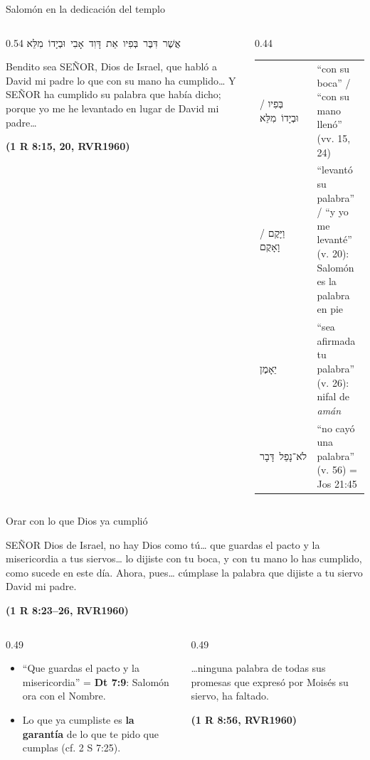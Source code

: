 \documentclass[hyperref={bookmarks=false},aspectratio=169]{beamer}
\newcommand{\heb}[1]{\mbox{\foreignlanguage{hebrew}{#1}}}
\newcommand{\SENOR}{S{\fontsize{0.78em}{1em}\selectfont EÑOR}}
\newcommand{\fuente}[1]{\par\hfill{\upshape\bfseries\footnotesize\textcolor{azul}{#1}}}
\newcommand{\destacar}[1]{\textbf{\textcolor{azul}{#1}}}
\begin{document}
\begin{frame}{Salomón en la dedicación del templo}
\begin{columns}[t,onlytextwidth]
\begin{column}{0.54\textwidth}
\centering\heb{אֲשֶׁר דִּבֶּר בְּפִיו אֵת דָּוִד אָבִי וּבְיָדוֹ מִלֵּא}
\begin{cita}Bendito sea \SENOR, Dios de Israel, que habló a David mi padre lo que con su mano ha cumplido\ldots{} Y \SENOR{} ha cumplido su palabra que había dicho; porque yo me he levantado en lugar de David mi padre\ldots\fuente{(1 R 8:15, 20, RVR1960)}\end{cita}
\end{column}
\begin{column}{0.44\textwidth}\scriptsize\renewcommand{\arraystretch}{1.12}
\begin{tabular}{@{}>{\RaggedRight\arraybackslash}p{1.7cm}>{\RaggedRight\arraybackslash}p{3.6cm}@{}}
\toprule
\heb{בְּפִיו} / \heb{וּבְיָדוֹ מִלֵּא} & ``con su boca'' / ``con su mano llenó'' (vv. 15, 24) \\
\heb{וַיָּקֶם} / \heb{וָאָקֻם} & ``levantó su palabra'' / ``y yo me levanté'' (v. 20): Salomón es la palabra en pie \\
\heb{יֵאָמֶן} & ``sea afirmada tu palabra'' (v. 26): nifal de \emph{amán} \\
\heb{לֹא־נָפַל דָּבָר} & ``no cayó una palabra'' (v. 56) = Jos 21:45 \\
\bottomrule
\end{tabular}
\end{column}
\end{columns}
\end{frame}

\begin{frame}{Orar con lo que Dios ya cumplió}
\begin{cita}\SENOR{} Dios de Israel, no hay Dios como tú\ldots{} que guardas el pacto y la misericordia a tus siervos\ldots{} lo dijiste con tu boca, y con tu mano lo has cumplido, como sucede en este día. Ahora, pues\ldots{} cúmplase la palabra que dijiste a tu siervo David mi padre.\fuente{(1 R 8:23--26, RVR1960)}\end{cita}
\begin{columns}[t,onlytextwidth]
\begin{column}{0.49\textwidth}\small
\begin{itemize}
\item ``Que guardas el pacto y la misericordia'' = \destacar{Dt 7:9}: Salomón ora con el Nombre.
\item Lo que ya cumpliste es \destacar{la garantía} de lo que te pido que cumplas (cf. 2 S 7:25).
\end{itemize}
\end{column}
\begin{column}{0.49\textwidth}
\begin{cita}\ldots{}ninguna palabra de todas sus promesas que expresó por Moisés su siervo, ha faltado.\fuente{(1 R 8:56, RVR1960)}\end{cita}
\end{column}
\end{columns}
\end{frame}
\end{document}
